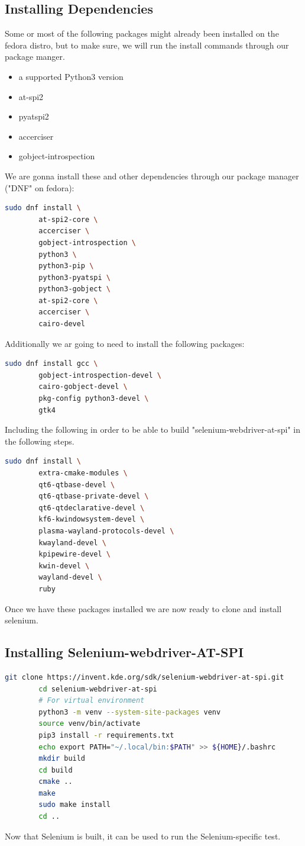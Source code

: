 \subsection{Installing Dependencies}
    Some or most of the following packages might already been installed on
    the fedora distro, but to make sure, we will run the install commands
    through our package manger.
    \begin{itemize}
        \item a supported Python3 version
        \item at-spi2
        \item pyatspi2
        \item accerciser
        \item gobject-introspection
    \end{itemize}
    We are gonna install these and other dependencies through our package
    manager ("DNF" on fedora):
    \begin{lstlisting}[language=bash, gobble=8]
        sudo dnf install \
        at-spi2-core \
        accerciser \
        gobject-introspection \
        python3 \
        python3-pip \
        python3-pyatspi \
        python3-gobject \
        at-spi2-core \
        accerciser \
        cairo-devel
    \end{lstlisting}
    Additionally we ar going to need to install the following packages:
    \begin{lstlisting}[language=bash, gobble=8]
        sudo dnf install gcc \
        gobject-introspection-devel \
        cairo-gobject-devel \
        pkg-config python3-devel \
        gtk4
    \end{lstlisting}
    Including the following in order to be able to build
    "selenium-webdriver-at-spi" in the following steps.
    \begin{lstlisting}[language=bash, gobble=8]
        sudo dnf install \
        extra-cmake-modules \
        qt6-qtbase-devel \
        qt6-qtbase-private-devel \
        qt6-qtdeclarative-devel \
        kf6-kwindowsystem-devel \
        plasma-wayland-protocols-devel \
        kwayland-devel \
        kpipewire-devel \
        kwin-devel \
        wayland-devel \
        ruby
    \end{lstlisting}
    Once we have these packages installed we are now ready to clone and
    install selenium.

\subsection{Installing Selenium-webdriver-AT-SPI}
    \begin{lstlisting}[language=bash, gobble=8]
        git clone https://invent.kde.org/sdk/selenium-webdriver-at-spi.git
        cd selenium-webdriver-at-spi
        # For virtual environment
        python3 -m venv --system-site-packages venv
        source venv/bin/activate
        pip3 install -r requirements.txt
        echo export PATH="~/.local/bin:$PATH" >> ${HOME}/.bashrc
        mkdir build
        cd build
        cmake ..
        make
        sudo make install
        cd ..
    \end{lstlisting}
    Now that Selenium is built, it can be used to run the Selenium-specific test.

